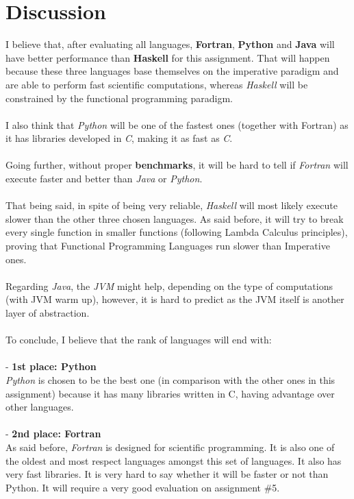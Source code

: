 \documentclass[conference]{IEEEtran}
\begin{document}
\section{Discussion}
I believe that, after evaluating all languages, \textbf{Fortran}, \textbf{Python} and \textbf{Java} will have better performance than \textbf{Haskell} for this assignment. That will happen because these three languages base themselves on the imperative paradigm and are able to perform fast scientific computations, whereas \textit{Haskell} will be constrained by the functional programming paradigm.
\\\\
I also think that \textit{Python} will be one of the fastest ones (together with Fortran) as it has libraries developed in \textit{C}, making it as fast as \textit{C}.\\\\
Going further, without proper \textbf{benchmarks}, it will be hard to tell if \textit{Fortran} will execute faster and better than \textit{Java} or \textit{Python}.
\\\\
That being said, in spite of being very reliable, \textit{Haskell} will most likely execute slower than the other three chosen languages. As said before, it will try to break every single function in smaller functions (following Lambda Calculus principles), proving that Functional Programming Languages run slower than Imperative ones.
\\\\
Regarding \textit{Java}, the \textit{JVM} might help, depending on the type of computations (with JVM warm up), however, it is hard to predict as the JVM itself is another layer of abstraction. 
\\\\
To conclude, I believe that the rank of languages will end with:
\\\\
- \textbf{1st place: Python}\\
\textit{Python} is chosen to be the best one (in comparison with the other ones in this assignment) because it has many libraries written in C, having advantage over other languages.
\\\\
- \textbf{2nd place: Fortran}\\
As said before, \textit{Fortran} is designed for scientific programming. It is also one of the oldest and most respect languages amongst this set of languages. It also has very fast libraries. It is very hard to say whether it will be faster or not than Python. It will require a very good evaluation on assignment \#5.
\end{document}
